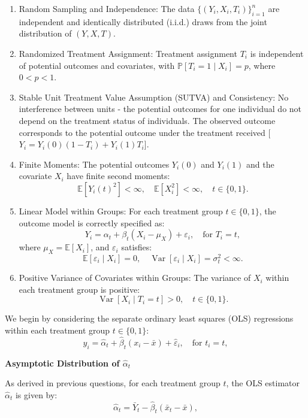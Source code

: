 \documentclass{article}
\begin{document}
\begin{enumerate}
    \item Random Sampling and Independence: The data $\{(Y_i, X_i, T_i)\}_{i=1}^n$ are independent and identically distributed (i.i.d.) draws from the joint distribution of $(Y, X, T)$.
    \item Randomized Treatment Assignment: Treatment assignment $T_i$ is independent of potential outcomes and covariates, with $\mathbb{P}[T_i = 1 \mid X_i] = p$, where $0 < p < 1$.
    \item Stable Unit Treatment Value Assumption (SUTVA) and Consistency: No interference between units - the potential outcomes for one individual do not depend on the treatment status of individuals. The observed outcome corresponds to the potential outcome under the treatment received [$Y_i = Y_i(0)(1 - T_i) + Y_i(1)T_i$].
    \item Finite Moments: The potential outcomes $Y_i(0)$ and $Y_i(1)$ and the covariate $X_i$ have finite second moments:
    \[
    \mathbb{E}[Y_i(t)^2] < \infty, \quad \mathbb{E}[X_i^2] < \infty, \quad t \in \{0,1\}.
    \]
    \item Linear Model within Groups: For each treatment group $t \in \{0,1\}$, the outcome model is correctly specified as:
    \[
    Y_i = \alpha_t + \beta_t (X_i - \mu_X) + \varepsilon_i, \quad \text{for } T_i = t,
    \]
    where $\mu_X = \mathbb{E}[X_i]$, and $\varepsilon_i$ satisfies:
    \[
    \mathbb{E}[\varepsilon_i \mid X_i] = 0, \quad \operatorname{Var}[\varepsilon_i \mid X_i] = \sigma_t^2 < \infty.
    \]
    \item Positive Variance of Covariates within Groups: The variance of $X_i$ within each treatment group is positive:
    \[
    \operatorname{Var}[X_i \mid T_i = t] > 0, \quad t \in \{0,1\}.
    \]
\end{enumerate}

We begin by considering the separate ordinary least squares (OLS) regressions within each treatment group $t \in \{0,1\}$:
\[
y_i = \hat{\alpha}_t + \hat{\beta}_t (x_i - \bar{x}) + \hat{\varepsilon}_i, \quad \text{for } t_i = t,
\]

\textbf{Asymptotic Distribution of $\hat{\alpha}_t$}

As derived in previous questions, for each treatment group $t$, the OLS estimator $\hat{\alpha}_t$ is given by:
\[
\hat{\alpha}_t = \bar{Y}_t - \hat{\beta}_t (\bar{x}_t - \bar{x}),
\]
\end{document}
